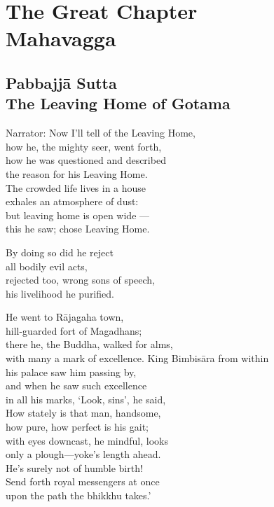 \begin{MyDescription}[(Sn.376-404)]{}
\end{MyDescription}



   
\part{The Great Chapter\\ Mahavagga}

\chapter{Pabbajj\=a Sutta\\ The Leaving Home of Gotama}

\begin{MyDescription}[]{Narrator:}
Now I'll tell of the Leaving Home,\\
how he, the mighty seer, went forth,\\
how he was questioned and described\\
the reason for his Leaving Home.\\
The crowded life lives in a house\\
exhales an atmosphere of dust:\\
but leaving home is open wide —\\
this he saw; chose Leaving Home.
\end{MyDescription}

\begin{MyDescription}[]{}
By doing so did he reject\\
all bodily evil acts,\\
rejected too, wrong sons of speech,\\
his livelihood he purified.
\end{MyDescription}

\begin{MyDescription}[]{}
He went to R\=ajagaha town,\\
hill-guarded fort of Magadhans;\\
there he, the Buddha, walked for alms,\\
with many a mark of excellence.
King Bimbis\=ara from within\\
his palace saw him passing by,\\
and when he saw such excellence\\
in all his marks, `Look, sins', he said,\\
How stately is that man, handsome,\\
how pure, how perfect is his gait;\\
with eyes downcast, he mindful, looks\\
only a plough—yoke's length ahead.\\
He's surely not of humble birth!\\
Send forth royal messengers at once\\
upon the path the bhikkhu takes.'
\end{MyDescription}


